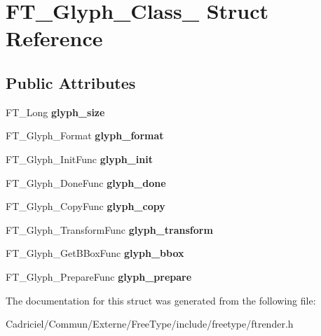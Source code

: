 \hypertarget{struct_f_t___glyph___class__}{}\section{F\+T\+\_\+\+Glyph\+\_\+\+Class\+\_\+ Struct Reference}
\label{struct_f_t___glyph___class__}
\subsection*{Public Attributes}
\begin{DoxyCompactItemize}
\item 
F\+T\+\_\+\+Long {\bfseries glyph\+\_\+size}\hypertarget{struct_f_t___glyph___class___a1a76c68b9fb0e93947e888c0fe77cbf8}{}\label{struct_f_t___glyph___class___a1a76c68b9fb0e93947e888c0fe77cbf8}

\item 
F\+T\+\_\+\+Glyph\+\_\+\+Format {\bfseries glyph\+\_\+format}\hypertarget{struct_f_t___glyph___class___a26738bd14d5845e18d09ccaa3a709d23}{}\label{struct_f_t___glyph___class___a26738bd14d5845e18d09ccaa3a709d23}

\item 
F\+T\+\_\+\+Glyph\+\_\+\+Init\+Func {\bfseries glyph\+\_\+init}\hypertarget{struct_f_t___glyph___class___a657200ad15ff061b38fb25b168737f95}{}\label{struct_f_t___glyph___class___a657200ad15ff061b38fb25b168737f95}

\item 
F\+T\+\_\+\+Glyph\+\_\+\+Done\+Func {\bfseries glyph\+\_\+done}\hypertarget{struct_f_t___glyph___class___aabf05a4368dccacf45e1a54e542e5d63}{}\label{struct_f_t___glyph___class___aabf05a4368dccacf45e1a54e542e5d63}

\item 
F\+T\+\_\+\+Glyph\+\_\+\+Copy\+Func {\bfseries glyph\+\_\+copy}\hypertarget{struct_f_t___glyph___class___afc78dcdc4802760ebcaccf3a7b6cd088}{}\label{struct_f_t___glyph___class___afc78dcdc4802760ebcaccf3a7b6cd088}

\item 
F\+T\+\_\+\+Glyph\+\_\+\+Transform\+Func {\bfseries glyph\+\_\+transform}\hypertarget{struct_f_t___glyph___class___a5f72ac1d0d92eb31fa3e2bb721a97ef2}{}\label{struct_f_t___glyph___class___a5f72ac1d0d92eb31fa3e2bb721a97ef2}

\item 
F\+T\+\_\+\+Glyph\+\_\+\+Get\+B\+Box\+Func {\bfseries glyph\+\_\+bbox}\hypertarget{struct_f_t___glyph___class___a06bfad431865c6731305cb781f78b317}{}\label{struct_f_t___glyph___class___a06bfad431865c6731305cb781f78b317}

\item 
F\+T\+\_\+\+Glyph\+\_\+\+Prepare\+Func {\bfseries glyph\+\_\+prepare}\hypertarget{struct_f_t___glyph___class___af7f406e5ea20a6614c946746938830c9}{}\label{struct_f_t___glyph___class___af7f406e5ea20a6614c946746938830c9}

\end{DoxyCompactItemize}


The documentation for this struct was generated from the following file\+:\begin{DoxyCompactItemize}
\item 
Cadriciel/\+Commun/\+Externe/\+Free\+Type/include/freetype/ftrender.\+h\end{DoxyCompactItemize}
